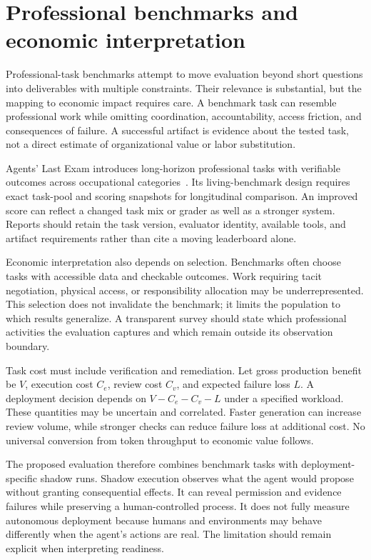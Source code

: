 \section{Professional benchmarks and economic interpretation}\label{sec:C24:professional}
Professional-task benchmarks attempt to move evaluation beyond short questions into deliverables with multiple constraints. Their relevance is substantial, but the mapping to economic impact requires care. A benchmark task can resemble professional work while omitting coordination, accountability, access friction, and consequences of failure. A successful artifact is evidence about the tested task, not a direct estimate of organizational value or labor substitution.

Agents' Last Exam introduces long-horizon professional tasks with verifiable outcomes across occupational categories~\cite{corpus260605405}. Its living-benchmark design requires exact task-pool and scoring snapshots for longitudinal comparison. An improved score can reflect a changed task mix or grader as well as a stronger system. Reports should retain the task version, evaluator identity, available tools, and artifact requirements rather than cite a moving leaderboard alone.

Economic interpretation also depends on selection. Benchmarks often choose tasks with accessible data and checkable outcomes. Work requiring tacit negotiation, physical access, or responsibility allocation may be underrepresented. This selection does not invalidate the benchmark; it limits the population to which results generalize. A transparent survey should state which professional activities the evaluation captures and which remain outside its observation boundary.

Task cost must include verification and remediation. Let gross production benefit be $V$, execution cost $C_e$, review cost $C_v$, and expected failure loss $L$. A deployment decision depends on $V-C_e-C_v-L$ under a specified workload. These quantities may be uncertain and correlated. Faster generation can increase review volume, while stronger checks can reduce failure loss at additional cost. No universal conversion from token throughput to economic value follows.

The proposed evaluation therefore combines benchmark tasks with deployment-specific shadow runs. Shadow execution observes what the agent would propose without granting consequential effects. It can reveal permission and evidence failures while preserving a human-controlled process. It does not fully measure autonomous deployment because humans and environments may behave differently when the agent's actions are real. The limitation should remain explicit when interpreting readiness.

